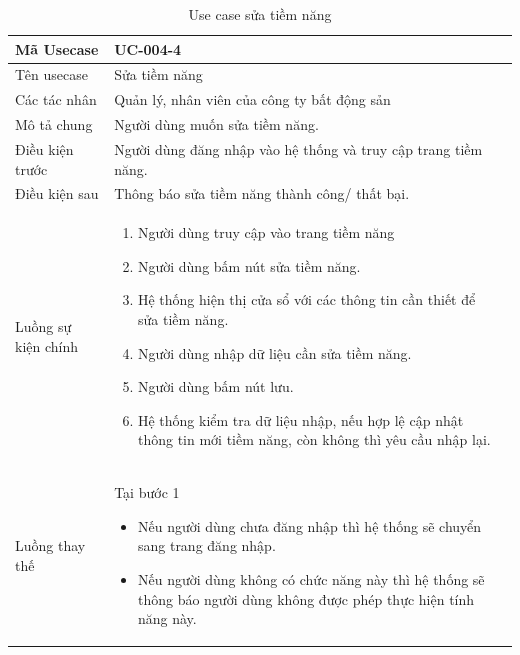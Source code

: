\documentclass[12pt,a4paper]{article}
\begin{document}
    \begin{table}[H]
        \centering
        \begin{tabular}{|p{3.5cm}|p{11.5cm}|c|}
            \hline
            Mã Usecase      & UC-004-4                                                       \\
            \hline
            Tên usecase     & Sửa tiềm năng                                                  \\
            \hline
            Các tác nhân    & Quản lý, nhân viên của công ty bất động sản                    \\
            \hline
            Mô tả chung     & Người dùng muốn sửa tiềm năng.                                 \\
            \hline
            Điều kiện trước & Người dùng đăng nhập vào hệ thống và truy cập trang tiềm năng. \\
            \hline
            Điều kiện sau   & Thông báo sửa tiềm năng thành công/ thất bại.                  \\
            \hline
            Luồng sự kiện chính & \vspace{-.8cm}\begin{enumerate}
                                                    \item Người dùng truy cập vào trang tiềm năng
                                                    \item  Người dùng bấm nút sửa tiềm năng.
                                                    \item  Hệ thống hiện thị cửa sổ với các thông tin cần thiết để sửa tiềm năng.
                                                    \item  Người dùng nhập dữ liệu cần sửa tiềm năng.
                                                    \item Người dùng bấm nút lưu.
                                                    \item Hệ thống kiểm tra dữ liệu nhập, nếu hợp lệ cập nhật thông tin mới tiềm năng, còn không thì yêu cầu nhập lại.
            \end{enumerate}
            \\
            \hline
            Luồng thay thế & Tại bước 1\newline
            \vspace{-.8cm}\begin{itemize}
                              \item Nếu người dùng chưa đăng nhập thì hệ thống sẽ chuyển sang trang đăng nhập.
                              \item  Nếu người dùng không có chức năng này thì hệ thống sẽ thông báo người dùng không được phép thực hiện tính năng này.
            \end{itemize}
            \\
            \hline
        \end{tabular}
        \caption{Use case sửa tiềm năng }
    \end{table}
\end{document}
